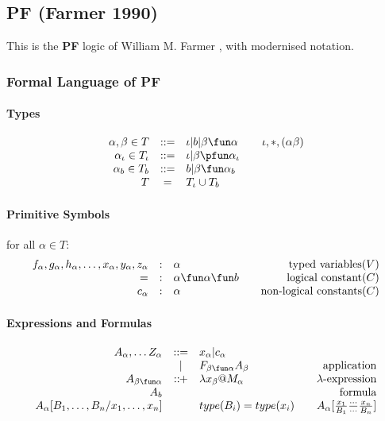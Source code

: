 
\subsection{\textbf{PF} (Farmer 1990)}

This is the \textbf{PF} logic of William M. Farmer \cite{Farmer90},
with modernised notation.

\subsubsection{Formal Language of PF}

\paragraph{Types}
$$\begin{array}{rcl@{\qquad}r}
   \alpha,\beta  \in T &::=& \iota | b | \beta \fun \alpha & \iota, *, (\alpha\beta)
\\ \alpha_\iota  \in T_\iota &::=& \iota | \beta \pfun \alpha_\iota
\\ \alpha_b  \in T_b &::=& b | \beta \fun \alpha_b
\\ T &=& T_\iota \cup T_b
\end{array}$$

\paragraph{Primitive Symbols}

for all $\alpha \in T$:
$$\begin{array}{rcl@{\qquad}r}
   f_\alpha,
   g_\alpha,
   h_\alpha,
   \ldots,
   x_\alpha,
   y_\alpha,
   z_\alpha &:& \alpha & \mbox{typed variables} (V)
\\ =        &:& \alpha \fun \alpha \fun b & \mbox{logical constant} (C)
\\ c_\alpha &:& \alpha & \mbox{non-logical constants} (C)
\end{array}$$


\paragraph{Expressions and Formulas}

$$\begin{array}{rcl@{\qquad}r}
   A_\alpha, \ldots Z_\alpha
   &::=& x_\alpha | c_\alpha
\\ &|& F_{\beta \fun \alpha}A_\beta & \mbox{application}
\\ A_{\beta\fun\alpha}
   &::\!\!+& \lambda x_\beta @ M_\alpha & \lambda\mbox{-expression}
\\ A_b  &&& \mbox{formula}
\\ A_\alpha[B_1,\ldots, B_n/x_1,\ldots,x_n]
  && type(B_i)=type(x_i) & A_\alpha[{x_1 \over B_1}{\cdots\over\cdots}{x_n \over B_n}]
\end{array}$$


